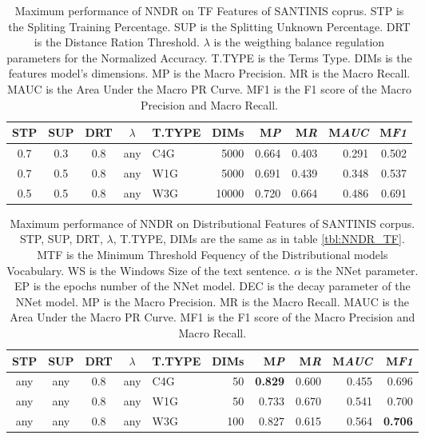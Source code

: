 \begin{table}
\center
\begin{tabular}{cccclrrrrr}
\hline
STP & SUP & DRT & $\lambda$ & T.TYPE & DIMs & M\emph{P} & M\emph{R} & M\emph{AUC} & M\emph{F1} \\
\hline
0.7 & 0.3 & 0.8 & any & C4G & 5000 & 0.664 & 0.403 & 0.291 & 0.502 \\
0.7 & 0.5 & 0.8 & any & W1G & 5000 & 0.691 & 0.439 & 0.348 & 0.537 \\
0.5 & 0.5 & 0.8 & any & W3G & 10000 & 0.720 & 0.664 & 0.486 & 0.691 \\
\hline
\end{tabular}
\caption {Maximum performance of NNDR on TF Features of SANTINIS coprus. STP is the Spliting Training Percentage. SUP is the Splitting Unknown Percentage. DRT is the Distance Ration Threshold. $\lambda$ is the weigthing balance regulation parameters for the Normalized Accuracy. T.TYPE is the Terms Type. DIMs is the features model's dimensions. MP is the Macro Precision. MR is the Macro Recall. MAUC is the Area Under the Macro PR Curve. MF1 is the F1 score of the Macro Precision and Macro Recall.}
\label{chap:word_embeddings:tbl:NNDR_TF}
\end{table}



\begin{table}
\center
\begin{tabular}{cccclrrrrr}
\hline
STP & SUP & DRT & $\lambda$ & T.TYPE & DIMs & M\emph{P} & M\emph{R} & M\emph{AUC} & M\emph{F1} \\
\hline
any & any & 0.8 & any & C4G & 50 & \textbf{0.829} & 0.600 & 0.455 & 0.696 \\
any & any & 0.8 & any & W1G & 50 & 0.733 & 0.670 & 0.541 & 0.700 \\
any & any & 0.8 & any & W3G & 100 & 0.827 & 0.615 & 0.564 & \textbf{0.706} \\
\hline
\end{tabular}
\caption {Maximum performance of NNDR on Distributional Features of SANTINIS corpus. STP, SUP, DRT, $\lambda$, T.TYPE, DIMs are the same as in table \ref{tbl:NNDR_TF}. MTF is the Minimum Threshold Fequency of the Distributional models Vocabulary. WS is the Windows Size of the text sentence. $\alpha$ is the NNet parameter. EP is the epochs number of the NNet model. DEC is the decay parameter of the NNet model. MP is the Macro Precision. MR is the Macro Recall. MAUC is the Area Under the Macro PR Curve. MF1 is the F1 score of the Macro Precision and Macro Recall.}
\label{chap:word_embeddings:tbl:NNDR_PVBOW}
\end{table}

